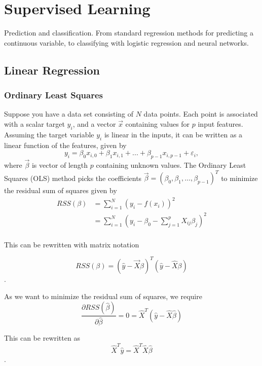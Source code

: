 \section{Supervised Learning}
Prediction and classification. From standard regression methods for predicting
a continuous variable, to classifying with logistic regression and neural
networks.

\subsection{Linear Regression}
\subsubsection{Ordinary Least Squares}\label{section:ols}
Suppose you have a data set consisting of $N$ data points. Each point is associated
with a scalar target $y_i$, and a vector $\vec{x}$ containing values for $p$ input
features. Assuming the target variable $y_i$ is linear in the inputs, it can be
written as a linear function of the features, given by
\begin{equation}
y_i = \beta_0 x_{i,0} + \beta_1 x_{i,1} + ... + \beta_{p-1} x_{i, p-1} + \varepsilon_i,
\end{equation}
where $\vec{\beta}$ is vector of length $p$ containing unknown values.
The Ordinary Least Squares (OLS) method picks the coefficients
\(\vec{\beta} = (\beta_0, \beta_1, \dots, \beta_{p-1})^T\) to minimize the
residual sum of squares given by
\begin{align}
	RSS(\beta) &= \sum\limits_{i=1}^N (y_i - f(x_i))^2\\
				&= \sum\limits_{i=1}^N
				(y_i - \beta_0 - \sum\limits_{j=1}^p X_{ij}\beta_j )^2\\
\end{align}

This can be rewritten with matrix notation

\begin{equation}
	RSS(\beta) = (\hat{y}-\vec{X}\beta)^T(\hat{y} - \hat{X}\beta)
\end{equation}.

As we want to minimize the residual sum of squares, we require
\begin{equation}
	\frac{\partial RSS(\hat{\beta})}{\partial \hat{\beta}}
	= 0
	= \hat{X}^T(\hat{y} - \hat{X}\hat{\beta})
\end{equation}

This can be rewritten as
\begin{equation}
	\hat{X}^T\hat{y} = \hat{X}^T\hat{X}\hat{\beta}
\end{equation}.

